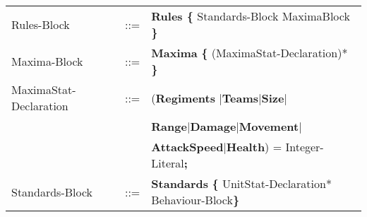 \begin{center}
\begin{longtable}{ l l p{7cm} }
	Rules-Block					&	::=	&{\bf Rules \{ }Standards-Block MaximaBlock	{\bf \} }	\\
	Maxima-Block				&	::=	&{\bf Maxima} {\bf \{} (MaximaStat-Declaration)* {\bf \}}\\
	MaximaStat-Declaration	&	::=	&({\bf Regiments }$\mid${\bf Teams}$\mid${\bf Size}$\mid$\\
								&		&{\bf Range}$\mid${\bf Damage}$\mid${\bf Movement}$\mid$\\
								&		&{\bf AttackSpeed}$\mid${\bf Health}) =  Integer-Literal{\bf ;}\\
	Standards-Block				&	::=	&{\bf Standards} {\bf \{ } UnitStat-Declaration* Behaviour-Block\bf{\} }		\\
\end{longtable}
\end{center}	


